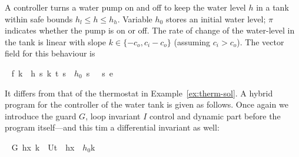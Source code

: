 \documentclass[envcountsame,envcountsect]{llncs}
\newcommand\notein[3]{\todo[inline,linecolor=orange!80!black,backgroundcolor=#2!20]{#1: #3}%
}
\newcommand{\gin}[1]{\notein{{\bf GS}}{gcolor}{#1}}
\begin{document}
\begin{example}\label{ex:tank-inv}
  A controller turns a water pump on and off to keep the water level
  $h$ in a tank within safe bounds $h_l\leq h\leq h_h$.  Variable
  $h_0$ stores an initial water level;  $\pi$ indicates whether the pump is
  on or off. The rate of change of the water-level in the tank is
  linear with slope $k\in\{-c_o,c_i-c_o\}$ (assuming $c_i>c_o$). The
  vector field for this behaviour is
\begin{isabellebody}
\isanewline
{}\ %
{\isachardoublequoteopen}f\ k\ {\isasymequiv}\ {\isasymlbrakk}{\isacharbrackleft}h\ {\isasymmapsto}\isactrlsub s\ k{\isacharcomma}\ t\ {\isasymmapsto}\isactrlsub s\ {}{\isacharcomma}\ $h_0$\ {\isasymmapsto}\isactrlsub s\ {}{\isacharcomma}\ {\isasympi}\ {\isasymmapsto}\isactrlsub s\ {}{\isacharbrackright}{\isasymrbrakk}\isactrlsub e{\isachardoublequoteclose}\isanewline
\end{isabellebody}
\noindent It differs from that of the thermostat in
Example~\ref{ex:therm-sol}. A hybrid program for the controller of the
water tank is given as follows. Once again we introduce the guard $G$,
loop invariant $I$ control and dynamic part before the program
itself---and this tim a differential invariant  as well:
\gin{What is $h_x$? }
\begin{isabellebody}
\isanewline
{}\ %
{\isachardoublequoteopen}G\ h\isactrlsub x\ k\ {\isasymequiv}\ U{\isacharparenleft}t\ {\isasymle}\ {\isacharparenleft}h\isactrlsub x\ {\isacharminus}\ $h_0${\isacharparenright}{\isacharslash}k{\isacharparenright}{\isachardoublequoteclose}\isanewline

\end{isabellebody}
\end{example}
\end{document}
